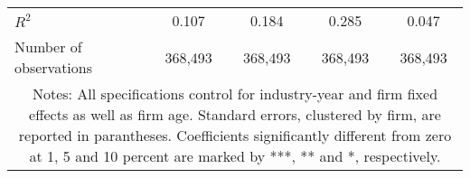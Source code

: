 \begin{tabular}{lcccc}
\\
	$R^2$ 
				& 0.107 
				& 0.184 
				& 0.285 
				& 0.047 \\
	Number of observations 
				& 368,493 
				& 368,493 
				& 368,493 
				& 368,493 \\
\hline \hline
\multicolumn{ 5 }{c}{\begin{minipage}{\textwidth}
\small Notes: All specifications control for industry-year and firm fixed effects as well as firm age. Standard errors, clustered by firm, are reported in parantheses. Coefficients significantly different from zero at 1, 5 and 10 percent are marked by ***, ** and *, respectively.

  \end{minipage} } \\
\end{tabular}
